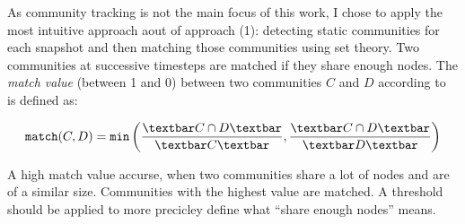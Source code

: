 As community tracking is not the main focus of this work, I chose to apply the most intuitive approach aout of approach (1): detecting static communities for each snapshot and then matching those communities using set theory.  Two communities at successive timesteps are matched if they share enough nodes. The \emph{match value} (between 1 and 0) between two communities $C$ and $D$ according to~\cite{hopcroft2004tracking} is defined as:

\begin{equation}
\label{eq:match}
\texttt{match}(C,D) = \texttt{min}\left( \frac{\textbar C\cap D \textbar}{\textbar C\textbar }, \frac{\textbar C\cap D \textbar}{\textbar D \textbar }\right)
\end{equation}

A high match value accurse, when two communities share a lot of nodes and are of a similar size. Communities with the highest value are matched. A threshold should be applied to more precicley define what ``share enough nodes'' means.
